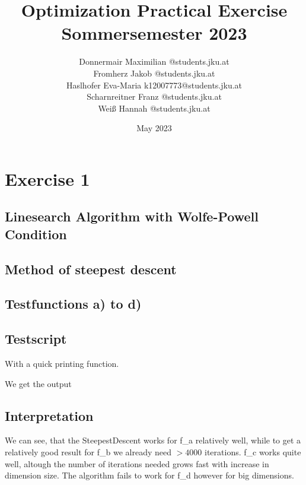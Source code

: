 \documentclass{article}
\title{Optimization Practical Exercise \\ Sommersemester 2023}
\author{Donnermair Maximilian @students.jku.at\\ Fromherz Jakob @students.jku.at\\Haslhofer Eva-Maria  k12007773@students.jku.at \\ Scharnreitner Franz @students.jku.at\\ Weiß Hannah @students.jku.at } %
\date{May 2023}
\begin{document}
\maketitle

\newpage

\section{Exercise 1}

\subsection{Linesearch Algorithm with Wolfe-Powell Condition}


\subsection{Method of steepest descent}



\subsection{Testfunctions a) to d)}








\subsection{Testscript}


With a quick printing function.


We get the output

\subsection{Interpretation}
We can see, that the SteepestDescent works for f\_a relatively well, while to get a relatively good result for f\_b we already need $>4000$ iterations.
f\_c works quite well, altough the number of iterations needed grows fast with increase in dimension size. The algorithm fails to work for f\_d however for big dimensions.
\end{document}
